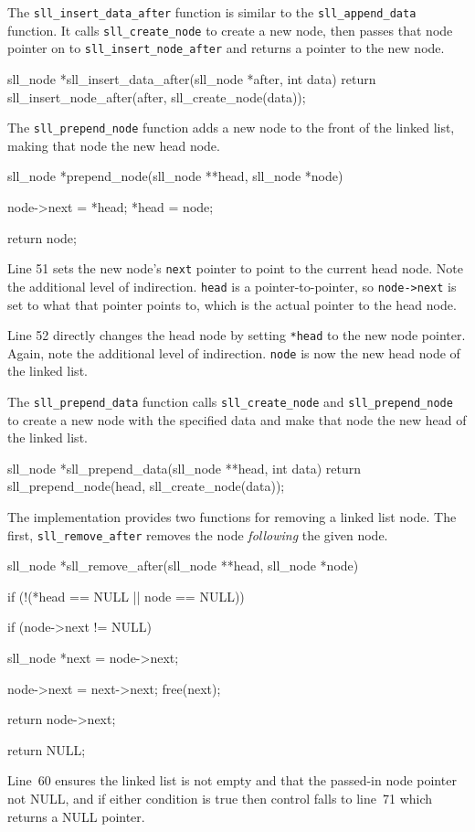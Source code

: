 \documentclass{article}
\begin{document}
  The \verb|sll_insert_data_after| function is similar to the \verb|sll_append_data| function. It calls \verb|sll_create_node| to create a new node, then passes that node pointer on to \verb|sll_insert_node_after| and returns a pointer to the new node.
  \begin{lstc}
sll_node *sll_insert_data_after(sll_node *after, int data) {
  return sll_insert_node_after(after, sll_create_node(data));
}\end{lstc}

  The \verb|sll_prepend_node| function adds a new node to the front of the linked list, making that node the new head node.
  \begin{lstc}
sll_node *prepend_node(sll_node **head, sll_node *node) {
  node->next = *head;
  *head = node;

  return node;
}\end{lstc}
  Line 51 sets the new node's \verb|next| pointer to point to the current head node. Note the additional level of indirection. \verb|head| is a pointer-to-pointer, so \verb|node->next| is set to what that pointer points to, which is the actual pointer to the head node.

  Line 52 directly changes the head node by setting \verb|*head| to the new node pointer. Again, note the additional level of indirection. \verb|node| is now the new head node of the linked list.

  The \verb|sll_prepend_data| function calls \verb|sll_create_node| and \verb|sll_prepend_node| to create a new node with the specified data and make that node the new head of the linked list.
  \begin{lstc}
sll_node *sll_prepend_data(sll_node **head, int data) {
  return sll_prepend_node(head, sll_create_node(data));
}\end{lstc}

  The implementation provides two functions for removing a linked list node. The first, \verb|sll_remove_after| removes the node \emph{following} the given node.
  \begin{lstc}
sll_node *sll_remove_after(sll_node **head, sll_node *node) {
  if (!(*head == NULL || node == NULL)) {
    if (node->next != NULL) {
      sll_node *next = node->next;

      node->next = next->next;
      free(next);
    }

    return node->next;
  }

  return NULL;
}\end{lstc}
  Line~60 ensures the linked list is not empty and that the passed-in node pointer not NULL, and if either condition is true then control falls to line~71 which returns a NULL pointer.
\end{document}
